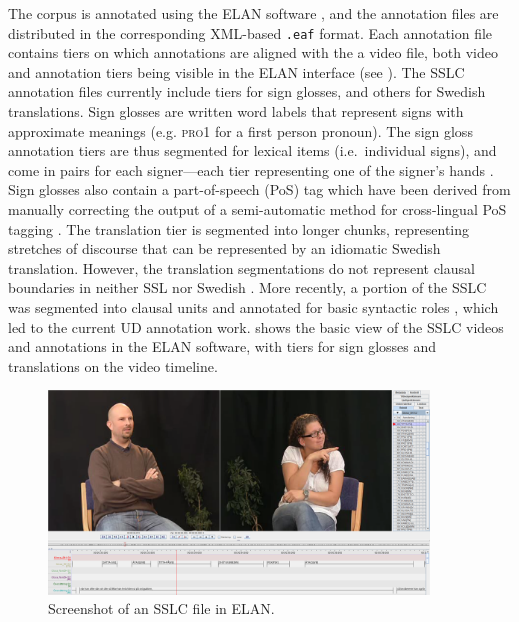 \documentclass[11pt]{article}
\begin{document}
The corpus is annotated using the ELAN software \cite{Wittenburg2006elan}, and the annotation files are distributed in the corresponding XML-based \texttt{.eaf} format. Each annotation file contains tiers on which annotations are aligned with the a video file, both video and annotation tiers being visible in the ELAN interface (see ). The SSLC annotation files currently include tiers for sign glosses, and others for Swedish translations. Sign glosses are written word labels that represent signs with approximate meanings (e.g. \textsc{pro1} for a first person pronoun). The sign gloss annotation tiers are thus segmented for lexical items (i.e.~individual signs), and come in pairs for each signer---each tier representing one of the signer's hands \cite{Mesch2015gloss}. Sign glosses also contain a part-of-speech (PoS) tag which have been derived from manually correcting the output of a semi-automatic method for cross-lingual PoS tagging \cite{Ostling2015enriching}. The translation tier is segmented into longer chunks, representing stretches of discourse that can be represented by an idiomatic Swedish translation. However, the translation segmentations do not represent clausal boundaries in neither SSL nor Swedish \cite{Borstell2014segmenting}. More recently, a portion of the SSLC was segmented into clausal units and annotated for basic syntactic roles \cite{Borstell2016syntactic}, which led to the current UD annotation work.  shows the basic view of the SSLC videos and annotations in the ELAN software, with tiers for sign glosses and translations on the video timeline.

\begin{figure}[p]
	\centering
	\includegraphics[width=0.9\textwidth]{sslc_elan.png}
	\caption{Screenshot of an SSLC file in ELAN.}
	\label{fig:sslc_elan}
\end{figure}
\end{document}
